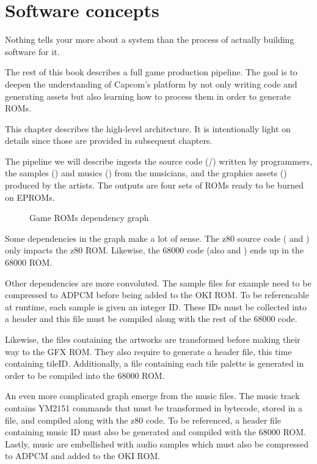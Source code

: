 \chapter{Software concepts}

Nothing tells your more about a system than the process of actually building software for it.

The rest of this book describes a full game production pipeline. The goal is to deepen the understanding of Capcom's platform by not only writing code and generating assets but also learning how to process them in order to generate ROMs.

This chapter describes the high-level architecture. It is intentionally light on details since those are provided in subsequent chapters.

The pipeline we will describe ingests the source code (/) written by programmers, the samples () and musics () from the musicians, and the graphics assets () produced by the artists. The outputs are four sets of ROMs ready to be burned on EPROMs. 

 \begin{figure}[H]
\caption*{Game ROMs dependency graph}
\end{figure}

\pagebreak
Some dependencies in the graph make a lot of sense. The z80 source code ( and ) only impacts the z80 ROM. Likewise, the 68000 code (also  and ) ends up in the 68000 ROM.

Other dependencies are more convoluted. The  sample files for example need to be compressed to ADPCM before being added to the OKI ROM. To be referencable at runtime, each sample is given an integer ID. These IDs must be collected into a  header and this file must be compiled along with the rest of the 68000 code.

Likewise, the  files containing the artworks are transformed before making their way to the GFX ROM. They also require to generate a  header file, this time containing tileID. Additionally, a  file containing each tile palette is generated in order to be compiled into the 68000 ROM. 

An even more complicated graph emerge from the music  files. The music track contains YM2151 commands that must be transformed in bytecode, stored in a  file, and compiled along with the z80 code. To be referenced, a header file containing music ID must also be generated and compiled with the 68000 ROM. Lastly, music are embellished with audio samples which must also be compressed to ADPCM and added to the OKI ROM.

